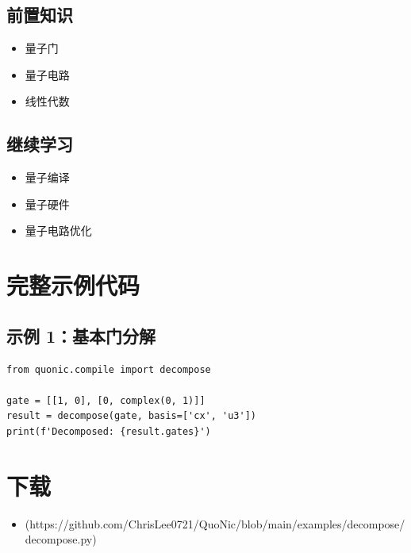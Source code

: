 \documentclass[12pt,a4paper]{article}
\begin{document}
\subsection{前置知识}
\begin{itemize}
  \item 量子门
  \item 量子电路
  \item 线性代数
\end{itemize}

\subsection{继续学习}
\begin{itemize}
  \item 量子编译
  \item 量子硬件
  \item 量子电路优化
\end{itemize}

\section{完整示例代码}

\subsection{示例 1：基本门分解}

\begin{verbatim}
from quonic.compile import decompose

gate = [[1, 0], [0, complex(0, 1)]]
result = decompose(gate, basis=['cx', 'u3'])
print(f'Decomposed: {result.gates}')
\end{verbatim}

\section{下载}

\begin{itemize}
  \item [decompose.py](https://github.com/ChrisLee0721/QuoNic/blob/main/examples/decompose/decompose.py)
\end{itemize}
\end{document}

